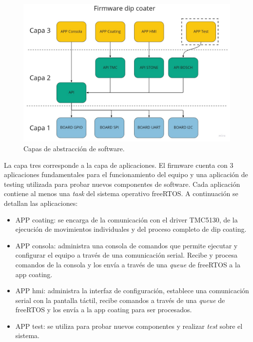 \begin{figure}[h]
	\centering
	\includegraphics[width=1\textwidth]{./Figures/capas.jpg}
	\caption{Capas de abstracción de software.}
	\label{fig:capas}
\end{figure}


La capa tres corresponde a la capa de aplicaciones. El firmware cuenta con 3 aplicaciones fundamentales para el funcionamiento del equipo y una aplicación de testing utilizada para probar nuevos componentes de software. Cada aplicación contiene al menos una \textit{task} del sistema operativo freeRTOS. A continuación se detallan las aplicaciones:

\begin{itemize}

\item APP coating: se encarga de la comunicación con el driver TMC5130, de la ejecución de movimientos individuales y del proceso completo de dip coating.
\item APP consola: administra una consola de comandos que permite ejecutar y configurar el equipo a través de una comunicación serial. Recibe y procesa comandos de la consola y los envía a través de una \textit{queue} de freeRTOS a la app coating.
\item APP hmi: administra la interfaz de configuración, establece una comunicación serial con la pantalla táctil, recibe comandos a través de una \textit{queue} de freeRTOS y los envía a la app coating para ser procesados.
\item APP test: se utiliza para probar nuevos componentes y realizar \textit{test} sobre el sistema.

\end{itemize}

